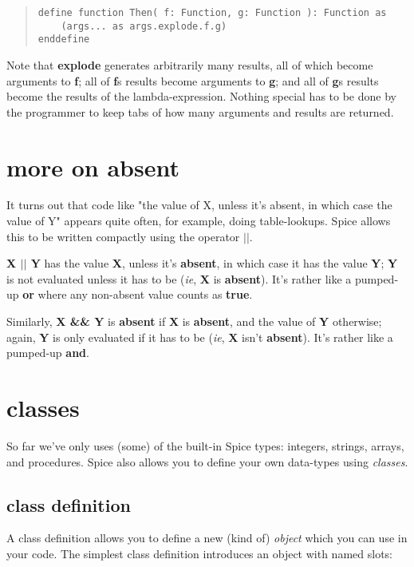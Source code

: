 \documentclass{report}
\begin{document}
\begin{quote}
\begin{verbatim}
define function Then( f: Function, g: Function ): Function as
    (args... as args.explode.f.g)
enddefine
\end{verbatim}
\end{quote}


Note that {\bf explode} generates arbitrarily many results, all of which become
arguments to {\bf f}; all of {\bf f}s results become arguments to {\bf g}; and all
of {\bf g}s results become the results of the lambda-expression. Nothing
special has to be done by the programmer to keep tabs of how many arguments
and results are returned.\chapter{more on {\bf absent}}


It turns out that code like "the value of X, unless it's absent, in which case
the value of Y" appears quite often, for example, doing table-lookups. Spice
allows this to be written compactly using the operator {\bf $\mid$$\mid$}.

{\bf X $\mid$$\mid$ Y} has the value {\bf X}, unless it's {\bf absent}, in which case it has the
value {\bf Y}; {\bf Y} is not evaluated unless it has to be ({\em ie}, {\bf X} is {\bf absent}).
It's rather like a pumped-up {\bf or} where any non-absent value counts as {\bf true}.

Similarly, {\bf X \&\& Y} is {\bf absent} if {\bf X} is {\bf absent}, and the value of {\bf Y}
otherwise; again, {\bf Y} is only evaluated if it has to be ({\em ie}, {\bf X} isn't
{\bf absent}). It's rather like a pumped-up {\bf and}.\chapter{classes}


So far we've only uses (some) of the built-in Spice types: integers, strings,
arrays, and procedures. Spice also allows you to define your own data-types
using {\em classes}.

\section{class definition}


A class definition allows you to define a new (kind of) {\em object} which you
can use in your code. The simplest class definition introduces an object
with named slots:
\end{document}
